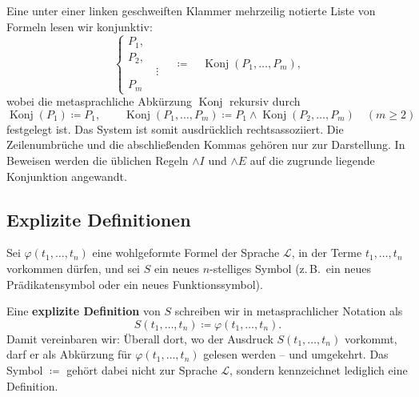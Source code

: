 \documentclass[main.tex]{subfiles}
\begin{document}
\begin{definition}
\label{def:conjunctive-system-meta}
Eine unter einer linken geschweiften Klammer mehrzeilig notierte Liste von
Formeln lesen wir konjunktiv:
\[
  \left\{
  \begin{aligned}
    P_1,\\
    P_2,\\[-2pt]
    &\ \vdots\\[-2pt]
    P_m
  \end{aligned}
  \right.
  \quad\coloneqq\quad
  \operatorname{Konj}(P_1,\ldots,P_m),
\]
wobei die metasprachliche Abkürzung \(\operatorname{Konj}\) rekursiv
durch
\[
  \operatorname{Konj}(P_1)\coloneqq P_1,
  \qquad
  \operatorname{Konj}(P_1,\ldots,P_m)
  \coloneqq
  P_1\land\operatorname{Konj}(P_2,\ldots,P_m)
  \quad(m\geq 2)
\]
festgelegt ist. Das System ist somit ausdrücklich rechtsassoziiert.
Die Zeilenumbrüche und die abschließenden Kommas gehören nur zur
Darstellung. In Beweisen werden die üblichen Regeln
\(\land I\) und \(\land E\) auf die zugrunde liegende Konjunktion
angewandt.
\end{definition}

\subsection{Explizite Definitionen}

\begin{definition}
Sei \(\varphi(t_1,\dots,t_n)\) eine wohlgeformte Formel der
Sprache \(\mathcal L\), in der Terme \(t_1,\dots,t_n\) vorkommen
dürfen, und sei \(S\) ein neues \(n\)-stelliges Symbol (z.\,B.\ ein
neues Prädikatensymbol oder ein neues Funktionssymbol).

Eine \textbf{explizite Definition} von \(S\) schreiben wir in
metasprachlicher Notation als
\[
  S(t_1,\dots,t_n) \coloneqq \varphi(t_1,\dots,t_n).
\]
Damit vereinbaren wir: Überall dort, wo der Ausdruck
\(S(t_1,\dots,t_n)\) vorkommt, darf er als Abkürzung für
\(\varphi(t_1,\dots,t_n)\) gelesen werden – und umgekehrt.
Das Symbol \(\coloneqq\) gehört dabei nicht zur Sprache
\(\mathcal L\), sondern kennzeichnet lediglich eine Definition.
\end{definition}
\end{document}
